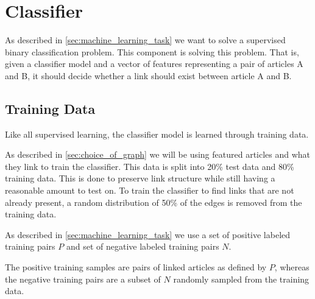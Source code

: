 \section{Classifier}\label{sec:classifier}
As described in \cref{sec:machine_learning_task} we want to solve a supervised binary classification problem. This component is solving this problem. That is, given a classifier model and a vector of features representing a pair of articles A and B, it should decide whether a link should exist between article A and B.

\subsection{Training Data}\label{sec:training_data}
Like all supervised learning, the classifier model is learned through training data.

As described in \ref{sec:choice_of_graph} we will be using featured articles and what they link to train the classifier. This data is split into 20\% test data and 80\% training data. This is done to preserve link structure while still having a reasonable amount to test on. To train the classifier to find links that are not already present, a random distribution of 50\% of the edges is removed from the training data.

As described in \cref{sec:machine_learning_task} we use a set of positive labeled training pairs $P$ and set of negative labeled training pairs $N$.


The positive training samples are pairs of linked articles as defined by $P$, whereas the negative training pairs are a subset of $N$ randomly sampled from the training data.


